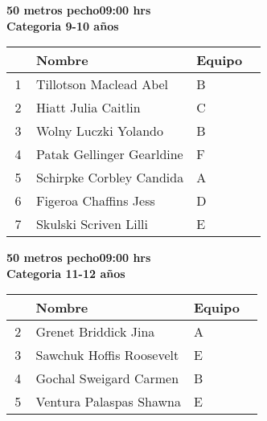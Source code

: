 \begin{minipage}{0.95\linewidth}\vspace{0.5cm} 
\begin{flushleft}
\textbf{
\hspace{-0.15cm}50 metros pecho\hspace{1.5cm}09:00 hrs \\Categoria 9-10 años}\vspace{-0.2cm} 
\end{flushleft}
\begin{tabular}{cp{0.63\linewidth}l}
\hline
& \textbf{Nombre} & \textbf{Equipo} \\ \hline
1 & Tillotson Maclead Abel & B \\ 
2 & Hiatt Julia Caitlin & C \\ 
3 & Wolny Luczki Yolando & B \\ 
4 & Patak Gellinger Gearldine & F \\ 
5 & Schirpke Corbley Candida & A \\ 
6 & Figeroa Chaffins Jess & D \\ 
7 & Skulski Scriven Lilli & E \\ 
\end{tabular}
\end{minipage}
\begin{minipage}{0.95\linewidth}\vspace{0.5cm} 
\begin{flushleft}
\textbf{
\hspace{-0.15cm}50 metros pecho\hspace{1.5cm}09:00 hrs \\Categoria 11-12 años}\vspace{-0.2cm} 
\end{flushleft}
\begin{tabular}{cp{0.63\linewidth}l}
\hline
& \textbf{Nombre} & \textbf{Equipo} \\ \hline
2 & Grenet Briddick Jina & A \\ 
3 & Sawchuk Hoffis Roosevelt & E \\ 
4 & Gochal Sweigard Carmen & B \\ 
5 & Ventura Palaspas Shawna & E \\ 
\end{tabular}
\end{minipage}
